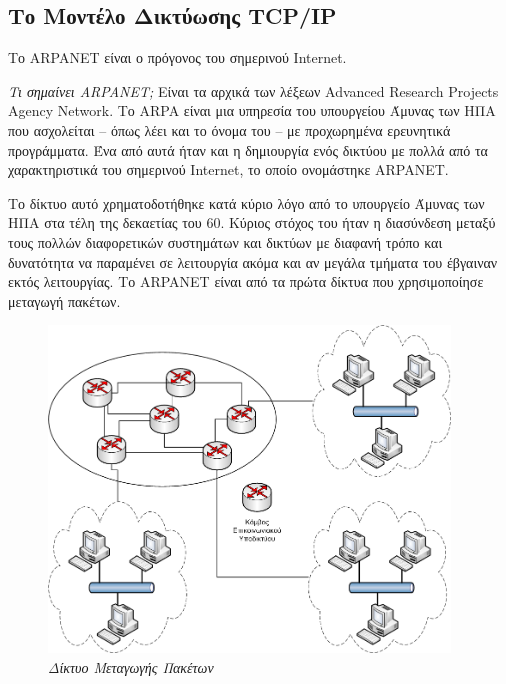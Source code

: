 %
%
\setcounter{section}{2}
\setcounter{subsection}{1}
\subsection{Το Μοντέλο Δικτύωσης TCP/IP}
Το ARPANET είναι ο πρόγονος του σημερινού Internet.

\begin{inthebox}
\emph{Τι σημαίνει ARPANET;} Είναι τα αρχικά των λέξεων Advanced Research Projects Agency Network.
Το ARPA είναι μια υπηρεσία του υπουργείου Άμυνας των ΗΠΑ που ασχολείται -- όπως λέει και το όνομα του --
με προχωρημένα ερευνητικά προγράμματα. Ένα από αυτά ήταν και η δημιουργία ενός δικτύου με πολλά από τα χαρακτηριστικά του σημερινού Internet, το οποίο ονομάστηκε ARPANET.\\
\end{inthebox}

Το δίκτυο αυτό χρηματοδοτήθηκε κατά κύριο λόγο από το υπουργείο Άμυνας των ΗΠΑ
στα τέλη της δεκαετίας του 60. Κύριος στόχος του ήταν η διασύνδεση μεταξύ τους
πολλών διαφορετικών συστημάτων και δικτύων με διαφανή τρόπο και δυνατότητα να παραμένει
σε λειτουργία ακόμα και αν μεγάλα τμήματα του έβγαιναν εκτός λειτουργίας. Το ARPANET είναι
από τα πρώτα δίκτυα που χρησιμοποίησε μεταγωγή πακέτων.

\begin{figure}[!ht]
  \centering
  \includegraphics[width=0.95\textwidth]{images/chapter1/1-2}
  \caption {\textsl{Δίκτυο Μεταγωγής Πακέτων}}
  \label{1-2}
\end{figure}

